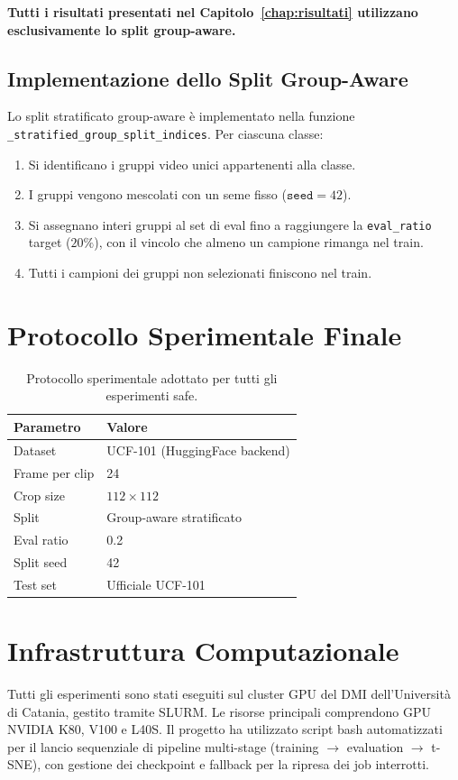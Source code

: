 \textbf{Tutti i risultati presentati nel Capitolo~\ref{chap:risultati} utilizzano esclusivamente lo split group-aware.}

\subsection{Implementazione dello Split Group-Aware}

Lo split stratificato group-aware è implementato nella funzione \texttt{\_stratified\_group\_split\_indices}. Per ciascuna classe:
\begin{enumerate}
    \item Si identificano i gruppi video unici appartenenti alla classe.
    \item I gruppi vengono mescolati con un seme fisso ($\texttt{seed} = 42$).
    \item Si assegnano interi gruppi al set di eval fino a raggiungere la \texttt{eval\_ratio} target ($20\%$), con il vincolo che almeno un campione rimanga nel train.
    \item Tutti i campioni dei gruppi non selezionati finiscono nel train.
\end{enumerate}

\section{Protocollo Sperimentale Finale}

\begin{table}[H]
\centering
\caption{Protocollo sperimentale adottato per tutti gli esperimenti safe.}
\label{tab:protocol}
\begin{tabular}{ll}
\toprule
\textbf{Parametro} & \textbf{Valore} \\
\midrule
Dataset & UCF-101 (HuggingFace backend) \\
Frame per clip & 24 \\
Crop size & $112 \times 112$ \\
Split & Group-aware stratificato \\
Eval ratio & 0.2 \\
Split seed & 42 \\
Test set & Ufficiale UCF-101 \\
\bottomrule
\end{tabular}
\end{table}

\section{Infrastruttura Computazionale}

Tutti gli esperimenti sono stati eseguiti sul cluster GPU del DMI dell'Università di Catania, gestito tramite SLURM. Le risorse principali comprendono GPU NVIDIA K80, V100 e L40S. Il progetto ha utilizzato script bash automatizzati per il lancio sequenziale di pipeline multi-stage (training $\rightarrow$ evaluation $\rightarrow$ t-SNE), con gestione dei checkpoint e fallback per la ripresa dei job interrotti.
